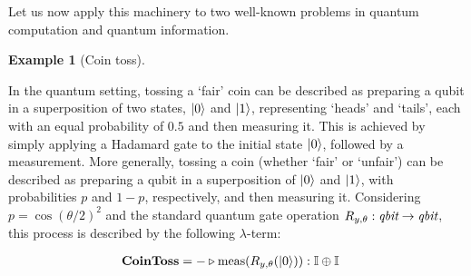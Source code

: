 \documentclass[10pt,a4paper]{amsart}
\theoremstyle{definition}
\theoremstyle{definition}
\newtheorem{example}[definition]{Example}
\theoremstyle{definition}
\theoremstyle{definition}
\theoremstyle{definition}
\theoremstyle{definition}
\begin{document}
Let us now apply this machinery to two well-known problems in quantum computation
and quantum information.

\begin{example}[Coin toss]
~
\end{example}

In the quantum setting, tossing a `fair' coin can be described as preparing a qubit in a superposition of two states, $\ket{0}$ and $\ket{1}$, representing `heads' and `tails', each with an equal probability of $0.5$ and then measuring it. This is achieved by simply applying a Hadamard gate to the initial state $\ket{0}$, followed by a measurement.
More generally, tossing a coin (whether `fair' or `unfair') can be described as preparing a qubit in a superposition of  $\ket{0}$ and $\ket{1}$, with probabilities $p$ and $1-p$, respectively,  and then measuring it.  Considering $p= \cos(\theta/2)^2$ and the standard quantum gate operation $R_{y,\theta} : \emph{qbit} \to \emph{qbit}$,  this process is described by the following $\lambda$-term:

\begin{align*}
  &\textbf{CoinToss} = - \triangleright \text{meas} (R_{y,\theta} (\ket{0})): \mathbb{I} \oplus \mathbb{I}
\end{align*}
\end{document}
